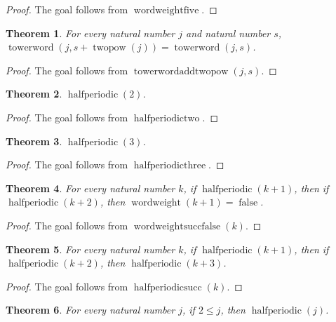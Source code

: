 \documentclass[11pt]{article}
\newtheorem{theorem}{Theorem}[section]
\theoremstyle{definition}
\begin{document}
\begin{proof}
The goal follows from \(\operatorname{wordweightfive}\).
\end{proof}
\begin{theorem}
\label{ll:observations:tower-word-add-twopow}
For every natural number \(j\) and natural number \(s\), \(\operatorname{towerword}(j, s + \operatorname{twopow}(j)) = \operatorname{towerword}(j, s)\).
\end{theorem}
\begin{proof}
The goal follows from \(\operatorname{towerwordaddtwopow}(j, s)\).
\end{proof}
\begin{theorem}
\label{ll:observations:half-periodic-two}
\(\operatorname{halfperiodic}(2)\).
\end{theorem}
\begin{proof}
The goal follows from \(\operatorname{halfperiodictwo}\).
\end{proof}
\begin{theorem}
\label{ll:observations:half-periodic-three}
\(\operatorname{halfperiodic}(3)\).
\end{theorem}
\begin{proof}
The goal follows from \(\operatorname{halfperiodicthree}\).
\end{proof}
\begin{theorem}
\label{ll:observations:word-weight-succ-false}
For every natural number \(k\), if \(\operatorname{halfperiodic}(k + 1)\), then if \(\operatorname{halfperiodic}(k + 2)\), then \(\operatorname{wordweight}(k + 1) = \operatorname{false}\).
\end{theorem}
\begin{proof}
The goal follows from \(\operatorname{wordweightsuccfalse}(k)\).
\end{proof}
\begin{theorem}
\label{ll:observations:half-periodic-succ}
For every natural number \(k\), if \(\operatorname{halfperiodic}(k + 1)\), then if \(\operatorname{halfperiodic}(k + 2)\), then \(\operatorname{halfperiodic}(k + 3)\).
\end{theorem}
\begin{proof}
The goal follows from \(\operatorname{halfperiodicsucc}(k)\).
\end{proof}
\begin{theorem}
\label{ll:observations:half-periodic-of-two-le}
For every natural number \(j\), if \(2 \le j\), then \(\operatorname{halfperiodic}(j)\).
\end{theorem}
\end{document}
